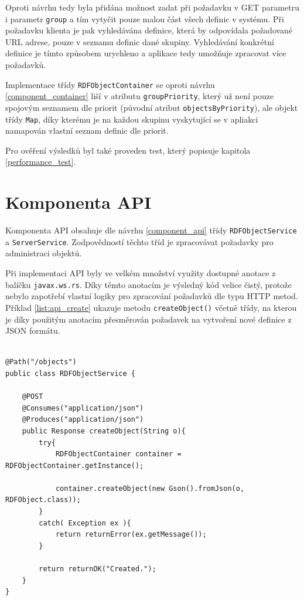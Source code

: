 \documentclass[thesis=B,czech]{FITthesis}[2012/06/26]
\begin{document}
  Oproti návrhu tedy byla přidána možnost zadat při požadavku v GET parametru i parametr \texttt{group} a tím vytyčit pouze malou část všech definic v systému.
  Při požadavku klienta je pak vyhledávána definice, která by odpovídala požadované URL adrese, pouze v seznamu definic dané skupiny. Vyhledávání konkrétní definice
  je tímto způsobem urychleno a aplikace tedy umožňuje zpracovat více požadavků. 
  
  Implementace třídy \texttt{RDFObjectContainer} se oproti návrhu \ref{component_container} liší v atributu \texttt{groupPriority}, který už není pouze spojovým seznamem
  dle priorit (původní atribut \texttt{objectsByPriority}), ale objekt třídy \texttt{Map}, díky kterému je na každou skupinu vyskytující se v apliakci
  namapován vlastní seznam definic dle priorit.
  
  Pro ověření výsledků byl také proveden test, který popisuje kapitola \ref{performance_test}.
      
  \section{Komponenta API}\label{impl_api}
  Komponenta API obsahuje dle návrhu \ref{component_api} třídy \texttt{RDFObjectService} a \texttt{ServerService}. Zodpovědností těchto tříd 
  je zpracovávat požadavky pro administraci objektů.
  
  Při implementaci API byly ve velkém množství využity dostupné anotace z balíčku \texttt{javax.ws.rs}. Díky těmto anotacím je výsledný kód velice čistý, protože
  nebylo zapotřebí vlastní logiky pro zpracování požadavků dle typu HTTP metod. Příklad \ref{list:api_create} ukazuje metodu \texttt{createObject()} včetně třídy,
  na kterou je díky použitým anotacím přesměrován požadavek na vytvoření nové definice z JSON formátu.
    
        \begin{lstlisting}[float=htb,caption={Příklad použití anotací při požadavku na vytvoření nové definice},label=list:api_create]
    
@Path("/objects")
public class RDFObjectService {

    @POST
    @Consumes("application/json")
    @Produces("application/json")
    public Response createObject(String o){
        try{
            RDFObjectContainer container = RDFObjectContainer.getInstance();

            container.createObject(new Gson().fromJson(o, RDFObject.class));
        }
        catch( Exception ex ){
            return returnError(ex.getMessage());
        }

        return returnOK("Created.");
    }
}
\end{lstlisting}
 
\end{document}

